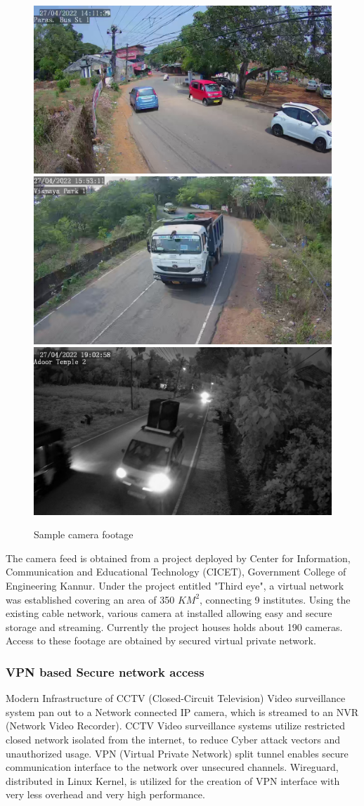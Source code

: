 \begin{figure}[!ht]
	\centering
	\includegraphics[width=0.32\linewidth]{Images/camera_footage/footage1} \hfill
	\includegraphics[width=0.32\linewidth]{Images/camera_footage/footage2} \hfill
	\includegraphics[width=0.32\linewidth]{Images/camera_footage/night1} \hfill
	\caption{Sample camera footage}
\end{figure}

The camera feed is obtained from a project deployed by Center for Information, Communication and Educational Technology (CICET), Government College of Engineering Kannur. Under the project entitled "Third eye", a virtual network was established covering an area of 350 $KM^2$, connecting 9 institutes. Using the existing cable network, various camera at installed allowing easy and secure storage and streaming. Currently the project houses holds about 190 cameras. Access to these footage are obtained by secured virtual private network.


\subsubsection{VPN based Secure network access}
Modern Infrastructure of CCTV (Closed-Circuit Television) Video surveillance system pan out to a Network connected IP camera, which is streamed to an NVR (Network Video Recorder). CCTV Video surveillance systems utilize restricted closed network isolated from the internet, to reduce Cyber attack vectors and unauthorized usage.  VPN (Virtual Private Network) split tunnel enables secure communication interface to the network over unsecured channels. Wireguard, distributed in Linux Kernel, is utilized for the creation of VPN interface with very less overhead and very high performance.

